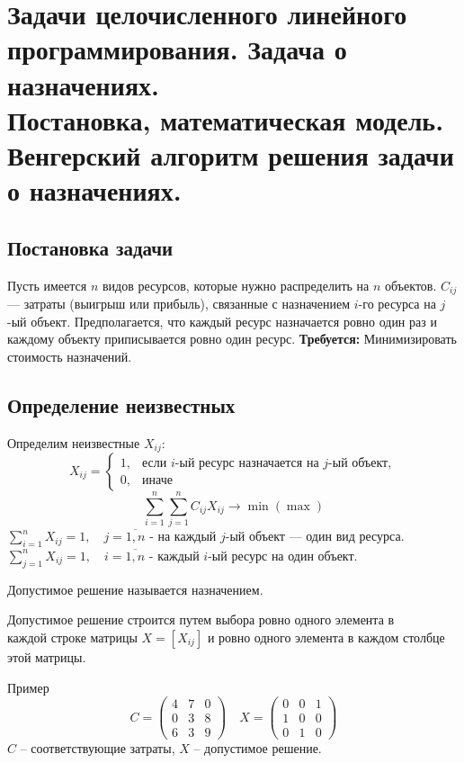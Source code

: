 \documentclass[17pt]{extarticle}
\begin{document}
\section{Задачи целочисленного линейного \\ программирования. Задача о назначениях. \\
  Постановка, математическая модель. \\ Венгерский алгоритм решения задачи о назначениях.}

\subsection{Постановка задачи}
Пусть имеется \( n \) видов ресурсов, которые нужно распределить на \( n \) объектов.
\( C_{ij} \) — затраты (выигрыш или прибыль), связанные с назначением \( i \)-го ресурса на \( j \)-ый объект.
Предполагается, что каждый ресурс назначается ровно один раз и каждому объекту приписывается ровно один ресурс.
\textbf{Требуется:} Минимизировать стоимость назначений.

\subsection{Определение неизвестных}
Определим неизвестные \( X_{ij} \):
\[
    X_{ij} =
    \begin{cases}
        1, & \text{если } i\text{-ый ресурс назначается на } j\text{-ый объект}, \\
        0, & \text{иначе}
    \end{cases}
\]
\[
    \sum_{i=1}^{n} \sum_{j=1}^{n} C_{ij} X_{ij} \rightarrow \min (\max)
\]
$\sum_{i=1}^{n} X_{ij} = 1, \quad j = \overline{1,n}$ - на каждый \( j \)-ый объект — один вид ресурса. \\
$\sum_{j=1}^{n} X_{ij} = 1, \quad i = \overline{1,n}$ - каждый \( i \)-ый ресурс на один объект. \\

\begin{definition}
    Допустимое решение называется назначением.
\end{definition}
Допустимое решение строится путем выбора ровно одного элемента в \\ каждой строке матрицы \( X = [X_{ij}] \) и
ровно одного элемента в каждом столбце этой матрицы.

Пример
\[
    C = \begin{pmatrix}
        4 & 7 & 0 \\
        0 & 3 & 8 \\
        6 & 3 & 9
    \end{pmatrix} \quad
    X = \begin{pmatrix}
        0 & 0 & 1 \\
        1 & 0 & 0 \\
        0 & 1 & 0
    \end{pmatrix}
\]
$C$ -- соответствующие затраты, $X$ -- допустимое решение.
\end{document}
